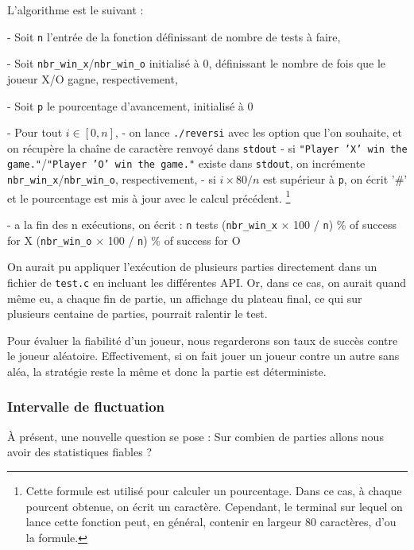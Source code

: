 \documentclass{report}
\begin{document}
L'algorithme est le suivant :\newline

- Soit \texttt{n} l'entrée de la fonction définissant de nombre de tests à faire,

- Soit \texttt{nbr\_win\_x}/\texttt{nbr\_win\_o} initialisé à 0, définissant le nombre de fois que le joueur X/O gagne, respectivement,

- Soit \texttt{p} le pourcentage d'avancement, initialisé à 0

- Pour tout $i\in[0,n]$,
\tabto{1 cm} - on lance \texttt{./reversi} avec les option que l'on souhaite, et on récupère la chaîne de caractère renvoyé dans \texttt{stdout}
\tabto{1 cm} - si \texttt{"Player 'X' win the game."}/\texttt{"Player 'O' win the game."} existe dans \texttt{stdout}, on incrémente \texttt{nbr\_win\_x}/\texttt{nbr\_win\_o}, respectivement,
\tabto{1 cm} - si $i\times80/n$ est supérieur à \texttt{p}, on écrit '\#' et le pourcentage est mis à jour avec le calcul précédent. \footnote{Cette formule est utilisé pour calculer un pourcentage. Dans ce cas, à chaque pourcent obtenue, on écrit un caractère. Cependant, le terminal sur lequel on lance cette fonction peut, en général, contenir en largeur 80 caractères, d'ou la formule.}

- a la fin des n exécutions, on écrit : \newline
\texttt{n} tests\newline
(\texttt{nbr\_win\_x} $\times$ 100 / \texttt{n}) \% of success for X\newline
(\texttt{nbr\_win\_o} $\times$ 100 / \texttt{n}) \% of success for O\newline

On aurait pu appliquer l'exécution de plusieurs parties directement dans un fichier de \texttt{test.c} en incluant les différentes API. Or, dans ce cas, on aurait quand même eu, a chaque fin de partie, un affichage du plateau final, ce qui sur plusieurs centaine de parties, pourrait ralentir le test. \newline

Pour évaluer la fiabilité d'un joueur, nous regarderons son taux de succès contre le joueur aléatoire. Effectivement, si on fait jouer un joueur contre un autre sans aléa, la stratégie reste la même et donc la partie est déterministe.

\subsubsection{Intervalle de fluctuation}
À présent, une nouvelle question se pose : Sur combien de parties allons nous avoir des statistiques fiables ?
\end{document}
